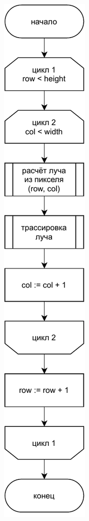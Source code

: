 \begin{figure}
	\centering
	\includegraphics[width=\linewidth,height=\textheight,keepaspectratio]{diagrams/fancy.pdf}
\end{figure}

